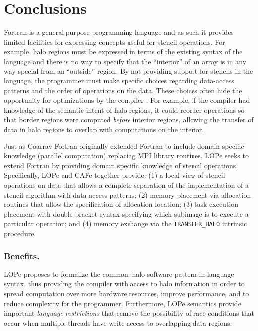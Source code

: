 \section{Conclusions}

Fortran is a general-purpose programming language and as such it provides limited facilities for
expressing concepts useful for stencil operations. For example, halo regions must be expressed in
terms of the existing syntax of the language and there is no way to specify that the ``interior''
of an array is in any way special from an ``outside'' region.  By not providing support for
stencils in the language, the programmer must make specific choices regarding data-access patterns
and the order of operations on the data.  These choices often hide the opportunity for
optimizations by the compiler \cite{Dubey:2014:SSC:2686745.2686756}.  For example, if the compiler
had knowledge of the semantic intent of halo regions, it could reorder operations so that border
regions were computed \emph{before} interior regions, allowing the transfer of data in halo regions
to overlap with computations on the interior.

Just as Coarray Fortran originally extended Fortran to include domain specific knowledge (parallel
computation) replacing MPI library routines\cite{Numrich:1998:CFP:289918.289920}, LOPe seeks to extend Fortran by
providing domain specific knowledge of stencil operations.
Specifically, LOPe and CAFe together provide:
(1) a local view of stencil operations on data that allows a complete separation of the implementation of a stencil
algorithm with data-access patterns;
(2) memory placement via allocation routines that allow the specification of allocation location;
(3) task execution placement with double-bracket syntax specifying which subimage is to execute a particular operation; and
(4) memory exchange via the \texttt{TRANSFER\_HALO} intrinsic procedure.

%
%


\vspace{-.1in}

\subsubsection{Benefits.}
LOPe proposes to formalize the common, halo software pattern in language syntax, thus providing the
compiler with access to halo information in order to spread computation over more hardware
resources, improve performance, and to reduce complexity for the programmer.  Furthermore, LOPe
semantics provide important \emph{language restrictions} that remove the possibility of race conditions
that occur when multiple threads have write access to overlapping data regions.

